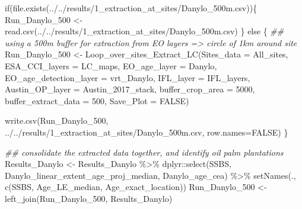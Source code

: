 \documentclass[
  letterpaper,
  DIV=11,
  numbers=noendperiod]{scrartcl}
\newenvironment{Shaded}{\begin{snugshade}}{\end{snugshade}}
\newcommand{\AttributeTok}[1]{\textcolor[rgb]{0.40,0.45,0.13}{#1}}
\newcommand{\ConstantTok}[1]{\textcolor[rgb]{0.56,0.35,0.01}{#1}}
\newcommand{\ControlFlowTok}[1]{\textcolor[rgb]{0.00,0.23,0.31}{#1}}
\newcommand{\DecValTok}[1]{\textcolor[rgb]{0.68,0.00,0.00}{#1}}
\newcommand{\DocumentationTok}[1]{\textcolor[rgb]{0.37,0.37,0.37}{\textit{#1}}}
\newcommand{\FunctionTok}[1]{\textcolor[rgb]{0.28,0.35,0.67}{#1}}
\newcommand{\NormalTok}[1]{\textcolor[rgb]{0.00,0.23,0.31}{#1}}
\newcommand{\OtherTok}[1]{\textcolor[rgb]{0.00,0.23,0.31}{#1}}
\newcommand{\SpecialCharTok}[1]{\textcolor[rgb]{0.37,0.37,0.37}{#1}}
\newcommand{\StringTok}[1]{\textcolor[rgb]{0.13,0.47,0.30}{#1}}
\begin{document}
\begin{Shaded}
\begin{Highlighting}[]
\ControlFlowTok{if}\NormalTok{(}\FunctionTok{file.exists}\NormalTok{(}\StringTok{\textquotesingle{}../../results/1\_extraction\_at\_sites/Danylo\_500m.csv\textquotesingle{}}\NormalTok{))\{}
\NormalTok{  Run\_Danylo\_500 }\OtherTok{\textless{}{-}} \FunctionTok{read.csv}\NormalTok{(}\StringTok{\textquotesingle{}../../results/1\_extraction\_at\_sites/Danylo\_500m.csv\textquotesingle{}}\NormalTok{)}
\NormalTok{\} }\ControlFlowTok{else}\NormalTok{ \{}
\DocumentationTok{\#\# using a 500m buffer for extraction from EO layers =\textgreater{} circle of 1km around site}
\NormalTok{Run\_Danylo\_500 }\OtherTok{\textless{}{-}} \FunctionTok{Loop\_over\_sites\_Extract\_LC}\NormalTok{(}\AttributeTok{Sites\_data =}\NormalTok{ All\_sites, }
                                             \AttributeTok{ESA\_CCI\_layers =}\NormalTok{ LC\_maps, }
                                             \AttributeTok{EO\_age\_layer =} \StringTok{\textquotesingle{}Danylo\textquotesingle{}}\NormalTok{,}
                                             \AttributeTok{EO\_age\_detection\_layer =}\NormalTok{ vrt\_Danylo,}
                                             \AttributeTok{IFL\_layer =}\NormalTok{ IFL\_layers, }
                                             \AttributeTok{Austin\_OP\_layer =}\NormalTok{ Austin\_2017\_stack,}
                                             \AttributeTok{buffer\_crop\_area =} \DecValTok{5000}\NormalTok{,}
                                             \AttributeTok{buffer\_extract\_data =} \DecValTok{500}\NormalTok{, }
                                             \AttributeTok{Save\_Plot =} \ConstantTok{FALSE}\NormalTok{)}

\FunctionTok{write.csv}\NormalTok{(Run\_Danylo\_500, }\StringTok{\textquotesingle{}../../results/1\_extraction\_at\_sites/Danylo\_500m.csv\textquotesingle{}}\NormalTok{, }\AttributeTok{row.names=}\ConstantTok{FALSE}\NormalTok{)}
\NormalTok{\}}


\DocumentationTok{\#\# consolidate the extracted data together, and identify oil palm plantations }
\NormalTok{Results\_Danylo }\OtherTok{\textless{}{-}}\NormalTok{ Results\_Danylo }\SpecialCharTok{\%\textgreater{}\%} 
\NormalTok{  dplyr}\SpecialCharTok{::}\FunctionTok{select}\NormalTok{(SSBS, Danylo\_linear\_extent\_age\_proj\_median, Danylo\_age\_cea) }\SpecialCharTok{\%\textgreater{}\%} 
  \FunctionTok{setNames}\NormalTok{(., }\FunctionTok{c}\NormalTok{(}\StringTok{\textquotesingle{}SSBS\textquotesingle{}}\NormalTok{, }\StringTok{\textquotesingle{}Age\_LE\_median\textquotesingle{}}\NormalTok{, }\StringTok{\textquotesingle{}Age\_exact\_location\textquotesingle{}}\NormalTok{))}
\NormalTok{Run\_Danylo\_500 }\OtherTok{\textless{}{-}} \FunctionTok{left\_join}\NormalTok{(Run\_Danylo\_500, Results\_Danylo)}
\end{Highlighting}
\end{Shaded}
\end{document}
